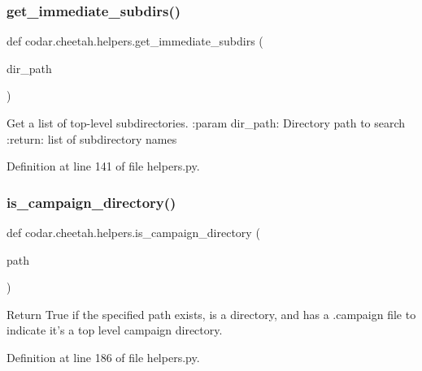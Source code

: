 \subsubsection{\texorpdfstring{get\+\_\+immediate\+\_\+subdirs()}{get\_immediate\_subdirs()}}
{\footnotesize\ttfamily def codar.\+cheetah.\+helpers.\+get\+\_\+immediate\+\_\+subdirs (\begin{DoxyParamCaption}\item[{}]{dir\+\_\+path }\end{DoxyParamCaption})}

\begin{DoxyVerb}Get a list of top-level subdirectories.
:param dir_path: Directory path to search
:return: list of subdirectory names
\end{DoxyVerb}
 

Definition at line 141 of file helpers.\+py.

\mbox{\label{namespacecodar_1_1cheetah_1_1helpers_a775ff4e04d63a594d5c46e780c452303}} 
\subsubsection{\texorpdfstring{is\+\_\+campaign\+\_\+directory()}{is\_campaign\_directory()}}
{\footnotesize\ttfamily def codar.\+cheetah.\+helpers.\+is\+\_\+campaign\+\_\+directory (\begin{DoxyParamCaption}\item[{}]{path }\end{DoxyParamCaption})}

\begin{DoxyVerb}Return True if the specified path exists, is a directory, and has a
.campaign file to indicate it's a top level campaign directory.\end{DoxyVerb}
 

Definition at line 186 of file helpers.\+py.

\mbox{\label{namespacecodar_1_1cheetah_1_1helpers_a6852aa01d4b165b01beca98ce9b1ddfe}} 
